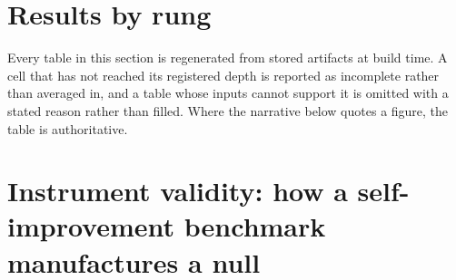 \documentclass[11pt]{article}
\begin{document}
\begin{abstract}
Section~\ref{sec:removed} lists every claim this project retracted, narrowed, or excluded, each
with the evidence that forced the change, including several that survived review and were
withdrawn only when a control arm was finally built.
\end{abstract}

\tableofcontents
\clearpage


\clearpage


\clearpage


\clearpage


\clearpage

\section{Results by rung}
\label{sec:results}

Every table in this section is regenerated from stored artifacts at build time. A cell that has
not reached its registered depth is reported as incomplete rather than averaged in, and a table
whose inputs cannot support it is omitted with a stated reason rather than filled. Where the
narrative below quotes a figure, the table is authoritative.



\clearpage


\clearpage
\section{Instrument validity: how a self-improvement benchmark manufactures a null}
\label{sec:instrument}


\clearpage


\clearpage



\clearpage
\appendix


\clearpage

\end{document}
